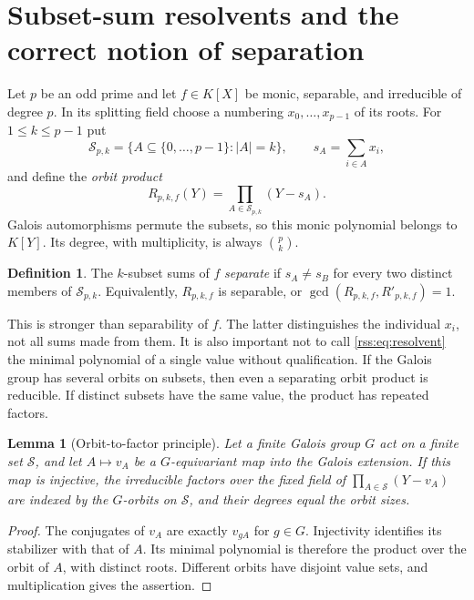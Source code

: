 \documentclass[11pt,a4paper]{article}
\newtheorem{lemma}[theorem]{Lemma}
\theoremstyle{definition}
\newtheorem{definition}[theorem]{Definition}
\theoremstyle{remark}
\begin{document}
\section{Subset-sum resolvents and the correct notion of separation}
\label{rss:sec:subset}

Let $p$ be an odd prime and let $f\in K[X]$ be monic, separable, and
irreducible of degree $p$. In its splitting field choose a numbering
$x_0,\ldots,x_{p-1}$ of its roots. For $1\leq k\leq p-1$ put
\[
 \mathcal S_{p,k}=\{A\subseteq\{0,\ldots,p-1\}:|A|=k\},\qquad
 s_A=\sum_{i\in A}x_i,
\]
and define the \emph{orbit product}
\begin{equation}
 R_{p,k,f}(Y)=\prod_{A\in\mathcal S_{p,k}}(Y-s_A).
 \label{rss:eq:resolvent}
\end{equation}
Galois automorphisms permute the subsets, so this monic polynomial belongs
to $K[Y]$. Its degree, with multiplicity, is always $\binom pk$.

\begin{definition}
The $k$-subset sums of $f$ \emph{separate} if $s_A\neq s_B$ for every two
distinct members of $\mathcal S_{p,k}$. Equivalently,
$R_{p,k,f}$ is separable, or $\gcd(R_{p,k,f},R'_{p,k,f})=1$.
\end{definition}

This is stronger than separability of $f$. The latter distinguishes the
individual $x_i$, not all sums made from them. It is also important not to
call \eqref{rss:eq:resolvent} the minimal polynomial of a single value without
qualification. If the Galois group has several orbits on subsets, then even
a separating orbit product is reducible. If distinct subsets have the same
value, the product has repeated factors.

\begin{lemma}[Orbit-to-factor principle]\label{rss:lem:orbitfactor}
Let a finite Galois group $G$ act on a finite set $\mathcal S$, and let
$A\mapsto v_A$ be a $G$-equivariant map into the Galois extension. If this
map is injective, the irreducible factors over the fixed field of
$\prod_{A\in\mathcal S}(Y-v_A)$ are indexed by the $G$-orbits on
$\mathcal S$, and their degrees equal the orbit sizes.
\end{lemma}
\begin{proof}
The conjugates of $v_A$ are exactly $v_{gA}$ for $g\in G$. Injectivity
identifies its stabilizer with that of $A$. Its minimal polynomial is
therefore the product over the orbit of $A$, with distinct roots. Different
orbits have disjoint value sets, and multiplication gives the assertion.
\end{proof}
\end{document}
